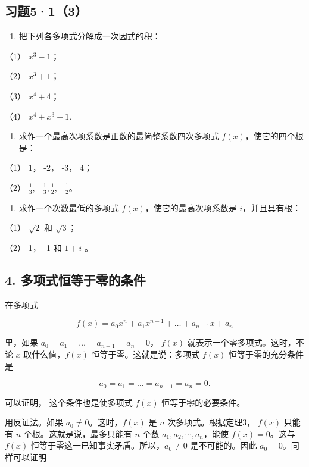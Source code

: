 \subsection{习题5·1（3）}

\begin{enumerate}
\item
  把下列各多项式分解成一次因式的积：
\end{enumerate}

（1） \(x^{3} - 1\)；

（2） \(x^{3} + 1\)；

（3） \(x^{4} + 4\)；

（4） \(x^{4} + x^{3} + 1.\)

\begin{enumerate}[start=2]
\item
  求作一个最高次项系数是正数的最简整系数四次多项式
  \(f(x)\)，使它的四个根是：
\end{enumerate}

（1） 1， -2， -3， 4；

（2） \(\frac{1}{3}, -\frac{1}{3}, \frac{1}{2}, -\frac{1}{2}\)。

\begin{enumerate}[start=3]
\item
  求作一个次数最低的多项式 \(f(x)\)，使它的最高次项系数是
  \(i\)，并且具有根：
\end{enumerate}

（1） \(\sqrt{2}\) 和 \(\sqrt{3}\)；

（2） 1， -1 和 \(1 + i\) 。

\subsection{4. 多项式恒等于零的条件}

在多项式

\[
f (x) = a _ {0} x ^ {n} + a _ {1} x ^ {n - 1} + \dots + a _ {n - 1} x + a _ {n}
\]

里，如果 \(a_0 = a_1 = \dots = a_{n-1} = a_n = 0\)， \(f(x)\)
就表示一个零多项式。这时，不论 \(x\) 取什么值，\(f(x)\)
恒等于零。这就是说：多项式 \(f(x)\) 恒等于零的充分条件是

\[
a _ {0} = a _ {1} = \dots = a _ {n - 1} = a _ {n} = 0.
\]

可以证明， 这个条件也是使多项式 \(f(x)\) 恒等于零的必要条件。

 用反证法。如果 \(a_0 \neq 0\)。这时，\(f(x)\) 是 \(n\)
次多项式。根据定理3， \(f(x)\) 只能有 \(n\) 个根。这就是说，最多只能有
\(n\) 个数 \(a_1, a_2, \cdots, a_n\)，能使 \(f(x) = 0\)。这与 \(f(x)\)
恒等于零这一已知事实矛盾。所以，\(a_0 \neq 0\) 是不可能的。因此
\(a_0 = 0\)。同样可以证明

